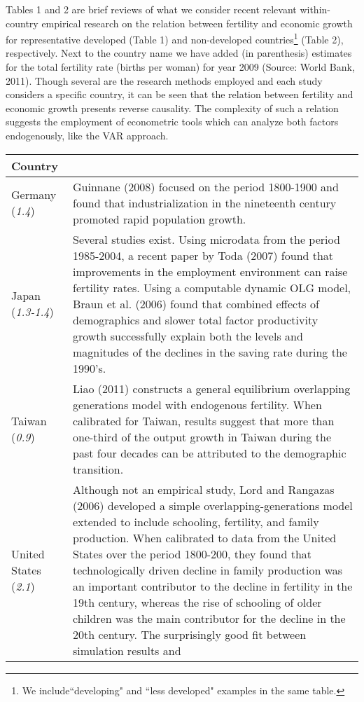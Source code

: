 \documentclass[12pt]{article}%
\begin{document}
Tables 1 and 2 are brief reviews of what we consider recent relevant within-country empirical research on the relation between fertility and economic growth for representative developed (Table 1) and non-developed countries\footnote{ We include``developing" and ``less developed" examples in the same table.} (Table 2), respectively. Next to the country name we have added (in parenthesis) estimates for the total fertility rate (births per woman) for year 2009 (Source: World Bank, 2011). Though several are the research methods employed and each study considers a specific country, it can be seen that the relation between fertility and economic growth presents reverse causality. The complexity of such a relation suggests the employment of econometric tools which can analyze both factors endogenously, like the VAR approach.
\begin{table}[h] \begin{center}
\begin{tabularx}{\linewidth}{lX}
Country & \\
\hline
Germany (\emph{1.4}) & Guinnane (2008) focused on the period 1800-1900 and found that industrialization in the
nineteenth century promoted rapid population growth.\\
Japan (\emph{1.3-1.4})& Several studies exist. Using microdata from the period
1985-2004, a recent paper by Toda (2007) found that improvements in the employment environment can raise fertility rates. Using a computable dynamic OLG model,
Braun et al. (2006) found that combined effects of demographics and slower total factor productivity growth successfully
explain both the levels and magnitudes of the declines in the saving rate during the 1990's. \\
Taiwan (\emph{0.9}) & Liao (2011) constructs a general equilibrium overlapping generations model with endogenous
fertility. When calibrated for Taiwan, results suggest that more than one-third of the output growth in Taiwan during the
past four decades can be attributed to the demographic transition.\\
United States (\emph{2.1}) & Although not an empirical study, Lord and Rangazas (2006) developed a simple
overlapping-generations model extended to include schooling, fertility, and family production. When calibrated to data
from the United States over the period 1800-200, they found that technologically driven decline in family production was
an important contributor to the decline in fertility in the 19th century, whereas the rise of schooling of older children
was the main contributor for the decline in the 20th century. The surprisingly good fit between simulation results and

\end{tabularx}
\end{center}
\end{table}
\end{document}

